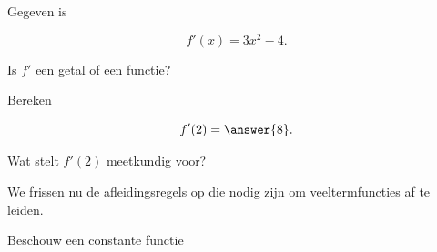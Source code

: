 \documentclass{ximera}
\begin{document}
\begin{oefening}{\oefB \ESS}

Gegeven is

\[
f'(x)=3x^2-4.
\]

\begin{question}

Is $f'$ een getal of een functie?

\begin{multipleChoice}
\end{multipleChoice}

\end{question}

\begin{question}

Bereken

\[
f'(2)=\answer{8}.
\]

\end{question}

\begin{question}

Wat stelt $f'(2)$ meetkundig voor?

\begin{multipleChoice}
\end{multipleChoice}

\end{question}

\end{oefening}




We frissen nu de afleidingsregels op die nodig zijn om
veeltermfuncties af te leiden.





Beschouw een constante functie
\end{document}
